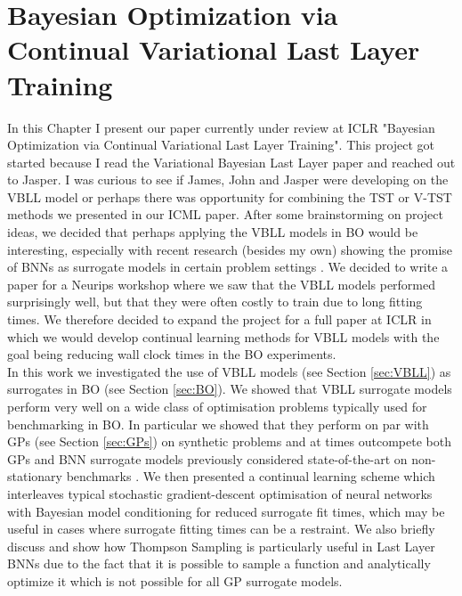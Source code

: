 \chapter{Bayesian Optimization via Continual  {Variational} Last Layer Training}
In this Chapter I present our paper currently under review at ICLR "Bayesian Optimization via Continual {Variational} Last Layer Training". This project got started because I read the Variational Bayesian Last Layer \citep{2024_VBLL} paper and reached out to Jasper. I was curious to see if James, John and Jasper were developing on the VBLL model or perhaps there was opportunity for combining the TST or V-TST methods we presented in our ICML paper. After some brainstorming on project ideas, we decided that perhaps applying the VBLL models in BO would be interesting, especially with recent research (besides my own) showing the promise of BNNs as surrogate models in certain problem settings \citep{li2024a}. We decided to write a paper for a Neurips workshop where we saw that the VBLL models performed surprisingly well, but that they were often costly to train due to long fitting times. We therefore decided to expand the project for a full paper at ICLR in which we would develop continual learning methods for VBLL models with the goal being reducing wall clock times in the BO experiments. \\

\noindent In this work we investigated the use of VBLL models (see Section \ref{sec:VBLL}) as surrogates in BO (see Section \ref{sec:BO}). We showed that VBLL surrogate models perform very well on a wide class of optimisation problems typically used for benchmarking in BO. In particular we showed that they perform on par with GPs (see Section \ref{sec:GPs}) on synthetic problems and at times outcompete both GPs and BNN surrogate models previously considered state-of-the-art on non-stationary benchmarks \citep{li2024a}. We then presented a continual learning scheme which interleaves typical stochastic gradient-descent optimisation of neural networks with Bayesian model conditioning for reduced surrogate fit times, which may be useful in cases where surrogate fitting times can be a restraint. We also briefly discuss and show how Thompson Sampling is particularly useful in Last Layer BNNs due to the fact that it is possible to sample a function and analytically optimize it which is not possible for all GP surrogate models.

